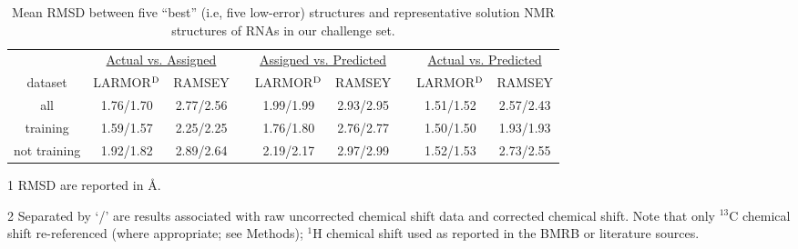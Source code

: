 \documentclass[journal=jcisd8,manuscript=article,layout=onecolumn]{achemso}
\begin{document}
\begin{table}[h!]
\centering
\caption{Mean RMSD between five ``best'' (i.e, five low-error) structures and representative solution NMR structures of RNAs in our challenge set.}
\begin{threeparttable}
\begin{tabular}{*9c}
\toprule
{} & \multicolumn{2}{c}{\underline{Actual vs. Assigned}} & {} & \multicolumn{2}{c}{\underline{Assigned vs. Predicted}} & {} & \multicolumn{2}{c}{\underline{Actual vs. Predicted}} \\
dataset & LARMOR$^{\rm D}$   & RAMSEY   & {} & LARMOR$^{\rm D}$  & RAMSEY   & {} & LARMOR$^{\rm D}$    & RAMSEY \\

\hline
all & 1.76/1.70 & 2.77/2.56 & {} & 1.99/1.99 & 2.93/2.95 & {} & 1.51/1.52 & 2.57/2.43 \\
training & 1.59/1.57 & 2.25/2.25 & {} & 1.76/1.80 & 2.76/2.77 & {} & 1.50/1.50 & 1.93/1.93 \\
not training & 1.92/1.82 & 2.89/2.64 & {} & 2.19/2.17 & 2.97/2.99 & {} & 1.52/1.53 & 2.73/2.55 \\
\hline
\end{tabular}
\begin{tablenotes}
\item[1] RMSD are reported in \AA.
\item[2] Separated by `/' are  results associated with raw uncorrected chemical shift data and corrected chemical shift. Note that only $^{13}$C chemical shift re-referenced (where appropriate; see Methods); $^{1}$H chemical shift used as reported in the BMRB or literature sources.  
\end{tablenotes}
\end{threeparttable}
\label{tab:meanrsmd} 
\end{table}
\end{document}
